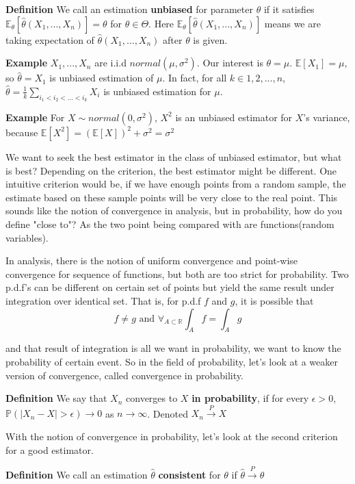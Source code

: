 \documentclass[a4paper,12pt]{article}
\begin{document}
\textbf{Definition} We call an estimation \textbf{unbiased} for parameter $\theta$ if it satisfies
$\mathbb{E}_\theta [\hat{\theta}( X_1, ..., X_n )] = \theta$ for $\theta \in \Theta$.
Here $\mathbb{E}_\theta [\hat{\theta}( X_1, ..., X_n )]$ means we are taking expectation of $\hat{\theta}( X_1, ..., X_n )$ after $\theta$ is given. 


\textbf{Example} $X_1, ..., X_n$ are i.i.d $normal( \mu, \sigma^2 )$. Our interest is $\theta = \mu$. $\mathbb{E}[X_1] = \mu$, so $\hat{\theta} = X_1$ is unbiased estimation of $\mu$. In fact, for all $k \in 1, 2, ..., n$, $\hat{\theta} = \frac{1}{k}\sum_{i_1 < i_2 < ...< i_k}X_i$ is unbiased estimation for $\mu$. 

\textbf{Example} For $X \sim normal(0, \sigma^2)$, $X^2$ is an unbiased estimator for $X$'s variance, because $\mathbb{E}[X^2] = (\mathbb{E}[X])^2 + \sigma^2 = \sigma^2$ 

We want to seek the best estimator in the class of unbiased estimator, but what is best? Depending on the criterion, the best estimator might be different. One intuitive criterion would be, if we have enough points from a random sample, the estimate based on these sample points will be very close to the real point. This sounds like the notion of convergence in analysis, but in probability, how do you define "close to"? As the two point being compared with are functions(random variables). 

In analysis, there is the notion of uniform convergence and point-wise convergence for sequence of functions, but both are too strict for probability. Two p.d.f's can be different on certain set of points but yield the same result under integration over identical set. That is, for p.d.f $f$ and $g$, it is possible that
$$f \neq g \text{ and } \forall_{A\subset \mathbb{R}} \int_A f = \int_A g$$

and that result of integration is all we want in probability, we want to know the probability of certain event. So in the field of probability, let's look at a weaker version of convergence, called convergence in probability. 

\textbf{Definition} We say that $X_n$ converges to $X$ \textbf{in probability}, if for every $\epsilon > 0$, $\mathbb{P}(|X_n-X|>\epsilon) \to 0$ as $n \to \infty$. Denoted $X_n \overset{P}{\to} X$ 

With the notion of convergence in probability, let's look at the second criterion for a good estimator. 

\textbf{Definition}  We call an estimation $\hat{\theta}$ \textbf{consistent} for $\theta$ if $\hat{\theta} \overset{P}{\to} \theta$ 
\end{document}
